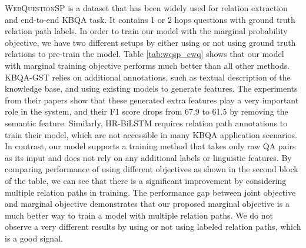 \textsc{WebQuestionSP} is a dataset that has been widely used for relation extraction and end-to-end KBQA task. It contains 1 or 2 hops questions with ground truth relation path labels. In order to train our model with the marginal probability objective, we have two different setups by either using or not using ground truth relations to pre-train the model. Table \ref{tab:wqsp_cwq} shows that our model with marginal training objective performs much better than all other methods. KBQA-GST \cite{DBLP:conf/ijcai/LanW019} relies on additional annotations, such as textual description of the knowledge base, and using existing models to generate features. The experiments from their papers show that these generated extra features play a very important role in the system, and their F1 score drops from 67.9 to 61.5 by removing the semantic feature. Similarly, HR-BiLSTM requires relation path annotations to train their model, which are not accessible in many KBQA application scenarios. In contrast, our model supports a training method that takes only raw QA pairs as its input and does not rely on any additional labels or linguistic features. By comparing performance of using different objectives as shown in the second block of the table, we can see that there is a significant improvement by considering multiple relation paths in training. The performance gap between joint objective and marginal objective demonstrates that our proposed marginal objective is a much better way to train a model with multiple relation paths. We do not observe a very different results by using or not using labeled relation paths, which is a good signal. 


\begin{table}[h]\centering
{}
\caption{\fontsize{10}{12}\selectfont We report F1 on WQSP and CWQ.}\label{tab:wqsp_cwq}
\end{table}


